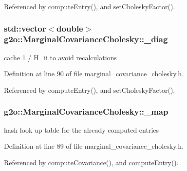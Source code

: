 Referenced by compute\+Entry(), and set\+Cholesky\+Factor().

\subsubsection[{\texorpdfstring{\+\_\+diag}{_diag}}]{\setlength{\rightskip}{0pt plus 5cm}std\+::vector$<$double$>$ g2o\+::\+Marginal\+Covariance\+Cholesky\+::\+\_\+diag\hspace{0.3cm}{\ttfamily [protected]}}\hypertarget{classg2o_1_1MarginalCovarianceCholesky_a6ceee33e0cde1d9a4888abab8b6ad712}{}\label{classg2o_1_1MarginalCovarianceCholesky_a6ceee33e0cde1d9a4888abab8b6ad712}


cache 1 / H\+\_\+ii to avoid recalculations 



Definition at line 90 of file marginal\+\_\+covariance\+\_\+cholesky.\+h.



Referenced by compute\+Entry(), and set\+Cholesky\+Factor().

\subsubsection[{\texorpdfstring{\+\_\+map}{_map}}]{ g2o\+::\+Marginal\+Covariance\+Cholesky\+::\+\_\+map\hspace{0.3cm}{\ttfamily [protected]}}\hypertarget{classg2o_1_1MarginalCovarianceCholesky_a7a9d21e9ee6654b9e6d69a62e87c201a}{}\label{classg2o_1_1MarginalCovarianceCholesky_a7a9d21e9ee6654b9e6d69a62e87c201a}


hash look up table for the already computed entries 



Definition at line 89 of file marginal\+\_\+covariance\+\_\+cholesky.\+h.



Referenced by compute\+Covariance(), and compute\+Entry().

